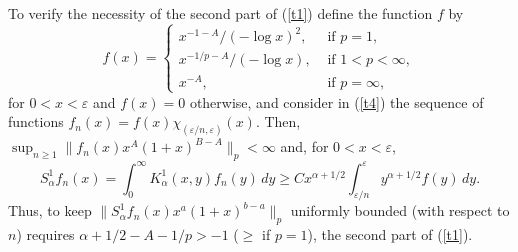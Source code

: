 \documentclass[leqno,a4paper]{amsart}
\begin{document}
To verify the necessity of the second part of (\ref{t1}) define the function
$f$ by
$$
f(x) =
\begin{cases}
x^{-1-A}/({-\log x})^2, & \text{ if } p=1,\\
x^{-1/p-A}/({-\log x}), & \text{ if } 1<p<\infty,\\
x^{-A}, & \text{ if } p=\infty,
\end{cases}
$$
for $0<x<\varepsilon$ and $f(x)=0$ otherwise, and
consider in (\ref{t4}) the sequence of functions $f_n(x)=f(x)
\chi_{(\varepsilon/n,\varepsilon)}(x)$. Then,
$\sup_{n\ge1}\|f_n(x)x^A(1+x)^{B-A}\|_p<\infty$
and, for $0<x<\varepsilon$,
$$
S_\alpha^1f_n(x) = \int_0^\infty K^1_\alpha(x,y) f_n(y)\,dy
\ge Cx^{\alpha+1/2} \int_{\varepsilon/n}^{\varepsilon}y^{\alpha+1/2}f(y)\,dy.
$$
Thus, to keep $\|S_\alpha^1f_n(x)x^a(1+x)^{b-a}\|_p$ uniformly bounded
(with respect to $n$) requires $\alpha+1/2-A-1/p>-1$ ($\ge$ if $p=1$),
the second part of (\ref{t1}).
\end{document}
